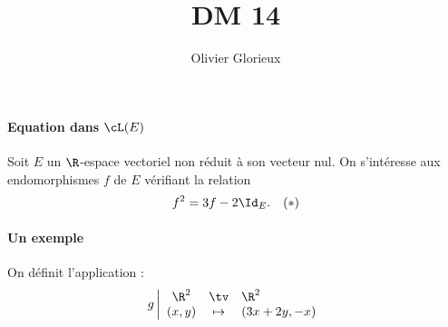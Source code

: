 \documentclass[a4paper, 11pt,reqno]{article}
\author{Olivier Glorieux}
\begin{document}
\title{DM 14  }

\paragraph{Equation dans $\cL(E)$ }

Soit $E$ un  $\R$-espace vectoriel non réduit à son vecteur nul. On s'intéresse aux endomorphismes $f$ de $E$ vérifiant la relation 
$$f^2 =3f - 2\Id_E.\quad (*) $$
\paragraph{Un exemple}



On définit l'application : 
$$g \left| \begin{array}{ccl}
\R^2 &\tv& \R^2 \\
(x,y) &\mapsto & (3x+2y, -x)
\end{array}\right.$$
\end{document}
